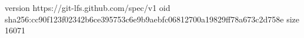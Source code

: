 version https://git-lfs.github.com/spec/v1
oid sha256:cc90f123f02342b6ce395753c6e9b9aebfc06812700a19829ff78a673c2d758e
size 16071
